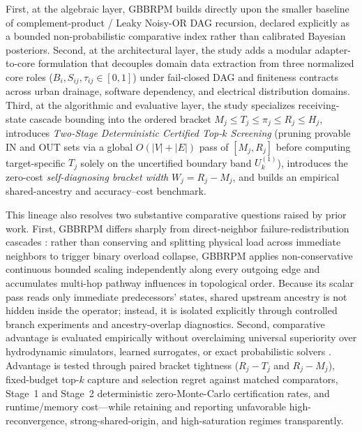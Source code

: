 First, at the algebraic layer, GBBRPM builds directly upon the smaller
baseline of complement-product / Leaky Noisy-OR DAG recursion, declared
explicitly as a bounded non-probabilistic comparative index rather than
calibrated Bayesian posteriors. Second, at the architectural layer, the
study adds a modular adapter-to-core formulation that decouples domain
data extraction from three normalized core roles ($B_i, S_{ij}, \tau_{ij}
\in [0,1]$) under fail-closed DAG and finiteness contracts across urban
drainage, software dependency, and electrical distribution domains.
Third, at the algorithmic and evaluative layer, the study specializes
receiving-state cascade bounding into the ordered bracket
$M_j \le T_j \le \pi_j \le R_j \le H_j$, introduces \emph{Two-Stage
Deterministic Certified Top-$k$ Screening} (pruning provable IN and OUT
sets via a global $O(|V|+|E|)$ pass of $[M_j,R_j]$ before computing
target-specific $T_j$ solely on the uncertified boundary band
$U_k^{(1)}$), introduces the zero-cost \emph{self-diagnosing bracket
width} $W_j = R_j - M_j$, and builds an empirical shared-ancestry and
accuracy--cost benchmark.

This lineage also resolves two substantive comparative questions raised
by prior work. First, GBBRPM differs sharply from direct-neighbor
failure-redistribution cascades \citep{buldyrev2010,he2019,shuang2017}:
rather than conserving and splitting physical load across immediate
neighbors to trigger binary overload collapse, GBBRPM applies
non-conservative continuous bounded scaling independently along every
outgoing edge and accumulates multi-hop pathway influences in topological
order. Because its scalar pass reads only immediate predecessors' states,
shared upstream ancestry is not hidden inside the operator; instead, it
is isolated explicitly through controlled branch experiments and
ancestry-overlap diagnostics. Second, comparative advantage is evaluated
empirically without overclaiming universal superiority over hydrodynamic
simulators, learned surrogates, or exact probabilistic solvers
\citep{dastgir2023,zhang2024}. Advantage is tested through paired bracket
tightness ($R_j - T_j$ and $R_j - M_j$), fixed-budget top-$k$ capture and
selection regret against matched comparators, Stage~1 and Stage~2
deterministic zero-Monte-Carlo certification rates, and runtime/memory
cost---while retaining and reporting unfavorable high-reconvergence,
strong-shared-origin, and high-saturation regimes transparently.



